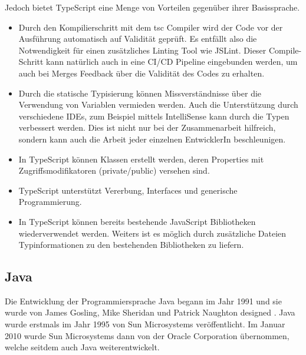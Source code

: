 Jedoch bietet TypeScript eine Menge von Vorteilen 
gegenüber ihrer Basissprache.
\begin{itemize}
  \item Durch den Kompilierschritt mit dem tsc Compiler wird der 
    Code vor der Ausführung automatisch auf Validität geprüft. 
    Es entfällt also die Notwendigkeit für einen zusätzliches Linting 
    Tool wie JSLint. Dieser Compile-Schritt kann natürlich auch in eine 
    CI/CD Pipeline eingebunden werden, um auch bei Merges Feedback über die 
    Validität des Codes zu erhalten.
  \item Durch die statische Typisierung können Missverständnisse über 
    die Verwendung von Variablen vermieden werden. Auch die Unterstützung 
    durch verschiedene IDEs, zum Beispiel mittels IntelliSense kann durch die 
    Typen verbessert werden. Dies ist nicht nur bei der Zusammenarbeit hilfreich, 
    sondern kann auch die Arbeit jeder einzelnen EntwicklerIn beschleunigen.
  \item In TypeScript können Klassen erstellt werden, deren Properties mit 
    Zugriffsmodifikatoren (private/public) versehen sind.
  \item TypeScript unterstützt Vererbung, Interfaces und generische Programmierung.
  \item In TypeScript können bereits bestehende JavaScript Bibliotheken 
    wiederverwendet werden. Weiters ist es möglich durch zusätzliche Dateien 
    Typinformationen zu den bestehenden Bibliotheken zu liefern.
\end{itemize}

\subsection{Java}

Die Entwicklung der Programmiersprache Java begann im Jahr 1991 und sie 
wurde von James Gosling, Mike Sheridan und Patrick Naughton designed \cite{WinnieDoug2021EJfA}.
Java wurde erstmals im Jahr 1995 von Sun Microsystems veröffentlicht. 
Im Januar 2010 wurde Sun Microsystems dann von der Oracle Corporation übernommen, 
welche seitdem auch Java weiterentwickelt.

